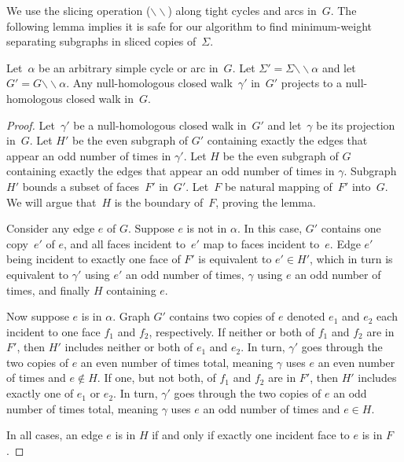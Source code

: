 \documentclass[letterpaper,review]{siamart190516}
\def\snip{\mathbin{\raisebox{0.15ex}{\rotatebox[origin=c]{60}{\Rightscissors}\!}}}
\def\snip{\mathbin{\backslash\!\!\backslash}}
\def\subsnip{\mathbin{\raisebox{0.15ex}{\rotatebox[origin=c]{60}{\footnotesize\Rightscissors}\!}}}
\def\Gsnip{\mathord{G_{\subsnip}}}
\def\Sigmasnip{\mathord{\Sigma_{\subsnip}}}
\def\gammasnip{\mathord{\gamma_{\subsnip}}}
\def\Gsnip{G'}
\def\Fsnip{F'}
\def\Sigmasnip{\Sigma'}
\def\gammasnip{\gamma'}
\def\Hsnip{H'}
\begin{document}
{We use the slicing operation ($\snip$) along tight cycles and arcs in~$G$.  The following lemma
implies it is safe for our algorithm to find minimum-weight separating subgraphs in sliced copies
of~$\Sigma$.

\begin{lemma}
\label{lem:global_null-homologous-projections}
Let~$\alpha$ be an arbitrary simple cycle or arc in~$G$.
Let
${\Sigmasnip = \Sigma \snip \alpha}$ and let~$\Gsnip = G \snip \alpha$. Any null-homologous closed
walk~$\gammasnip$ in~$\Gsnip$ projects  to a null-homologous closed walk in~$G$.
\end{lemma}

\begin{proof}
Let~$\gammasnip$ be a null-homologous closed walk in~$\Gsnip$ and let~$\gamma$ be its projection in~$G$.
Let $\Hsnip$ be the even subgraph of $\Gsnip$ containing exactly the edges that appear an odd number of
times in $\gammasnip$.
Let $H$ be the even subgraph of $G$ containing exactly the edges that appear an odd number of times
in $\gamma$.
Subgraph~$\Hsnip$ bounds a subset of faces~$\Fsnip$ in~$\Gsnip$. 
Let~$F$ be natural mapping of~$\Fsnip$ into~$G$.
We will argue that~$H$ is the boundary of~$F$, proving the lemma.

Consider any edge $e$ of $G$.
Suppose $e$ is not in $\alpha$.
In this case, $\Gsnip$ contains one copy~$e'$ of $e$, and all faces incident to~$e'$ map to faces
incident to~$e$.
Edge $e'$ being incident to exactly one face of $\Fsnip$ is equivalent to $e' \in H'$, which in turn
is equivalent to $\gammasnip$ using $e'$ an odd number of times, $\gamma$ using $e$ an odd number of
times, and finally $H$ containing $e$.

Now suppose $e$ is in $\alpha$.
Graph $\Gsnip$ contains two copies of $e$ denoted $e_1$ and $e_2$ each incident to one face $f_1$
and $f_2$, respectively.
If neither or both of $f_1$ and $f_2$ are in $\Fsnip$, then $\Hsnip$ includes neither or both of
$e_1$ and $e_2$.
In turn, $\gammasnip$ goes through the two copies of $e$ an even number of times total, meaning
$\gamma$ uses $e$ an even number of times and $e \notin H$.
If one, but not both, of $f_1$ and $f_2$ are in $\Fsnip$, then $\Hsnip$ includes exactly one of
$e_1$ or $e_2$.
In turn, $\gammasnip$ goes through the two copies of $e$ an odd number of times total, meaning
$\gamma$ uses $e$ an odd number of times and $e \in H$.

In all cases, an edge $e$ is in $H$ if and only if exactly one incident face to $e$ is in $F$.
\end{proof}

}
\end{document}
